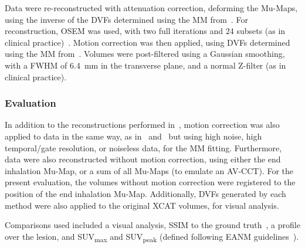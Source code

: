                 Data were re-reconstructed with attenuation correction, deforming the \glspl{Mu-Map}, using the inverse of the \glspl{DVF} determined using the \gls{MM} from~. For reconstruction, \gls{OSEM} was used, with two full iterations and $24$ subsets (as in clinical practice)~\parencite{Hudson1994}. Motion correction was then applied, using \glspl{DVF} determined using the \gls{MM} from~. Volumes were post-filtered using a Gaussian smoothing, with a \gls{FWHM} of \SI{6.4}{\milli\metre} in the transverse plane, and a normal Z-filter (as in clinical practice).
            
            \subsubsection{Evaluation} \label{sec:pet_ct_motion_correction_exploiting_motion_models_fit_on_coarsely_gated_data_applied_to_finely_gated_data_methods_evaluation}
                In addition to the reconstructions performed in~, motion correction was also applied to data in the same way, as in~ and~ but using high noise, high temporal/gate resolution, or noiseless data, for the \gls{MM} fitting. Furthermore, data were also reconstructed without motion correction, using either the end inhalation \gls{Mu-Map}, or a sum of all \glspl{Mu-Map} (to emulate an \gls{AV-CCT}). For the present evaluation, the volumes without motion correction were registered to the position of the end inhalation \gls{Mu-Map}. Additionally, \glspl{DVF} generated by each method were also applied to the original \gls{XCAT} volumes, for visual analysis.
                
                Comparisons used included a visual analysis, \gls{SSIM} to the ground truth~\parencite{Wang2009MeanMeasures}, a profile over the lesion, and \gls{SUV}\textsubscript{max} and \gls{SUV}\textsubscript{peak} (defined following \gls{EANM} guidelines~\parencite{Boellaard2015FDG2.0}).
        
